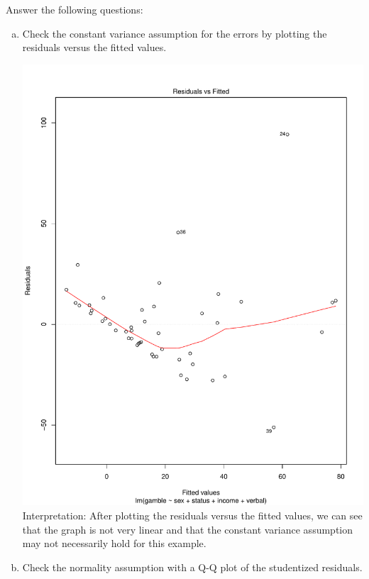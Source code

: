 \documentclass[12pt,letterpaper]{article}
\begin{document}
\vspace{.5cm}
  
\vspace{.5cm}
Answer the following questions:
\vspace{.5cm}
\begin{enumerate}[(a)]
	\item Check the constant variance assumption for the errors by plotting the residuals versus the fitted values.
	
	\includegraphics[width=1\textwidth, angle=0]{plot 1.1.pdf}
	Interpretation: After plotting the residuals versus the fitted values, we can see that the graph is not very linear and that the constant variance assumption may not necessarily hold for this example.
	\item Check the normality assumption with a Q-Q plot of the studentized residuals.
	

\end{enumerate}
\end{document}
